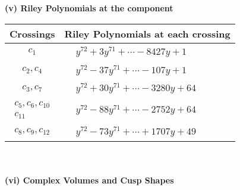 \documentclass[1p]{elsarticle_modified}
\theoremstyle{definition}
\begin{document}
\newpage\renewcommand{\arraystretch}{1}
\flushleft \textbf{(v) Riley Polynomials at the component}\newline \\
\begin{tabular}{m{50pt}|m{274pt}}
Crossings & \hspace{64pt}Riley Polynomials at each crossing \\
\hline $$\begin{aligned}c_{1}\end{aligned}$$&$\begin{aligned}
&y^{72}+3 y^{71}+\cdots-8427 y+1
\end{aligned}$\\
\hline $$\begin{aligned}c_{2},c_{4}\end{aligned}$$&$\begin{aligned}
&y^{72}-37 y^{71}+\cdots-107 y+1
\end{aligned}$\\
\hline $$\begin{aligned}c_{3},c_{7}\end{aligned}$$&$\begin{aligned}
&y^{72}+30 y^{71}+\cdots-3280 y+64
\end{aligned}$\\
\hline $$\begin{aligned}c_{5},c_{6},c_{10}\\c_{11}\end{aligned}$$&$\begin{aligned}
&y^{72}-88 y^{71}+\cdots-2752 y+64
\end{aligned}$\\
\hline $$\begin{aligned}c_{8},c_{9},c_{12}\end{aligned}$$&$\begin{aligned}
&y^{72}-73 y^{71}+\cdots+1707 y+49
\end{aligned}$\\
\hline
\end{tabular}\\~\\
\newpage\flushleft \textbf{(vi) Complex Volumes and Cusp Shapes}
\end{document}
